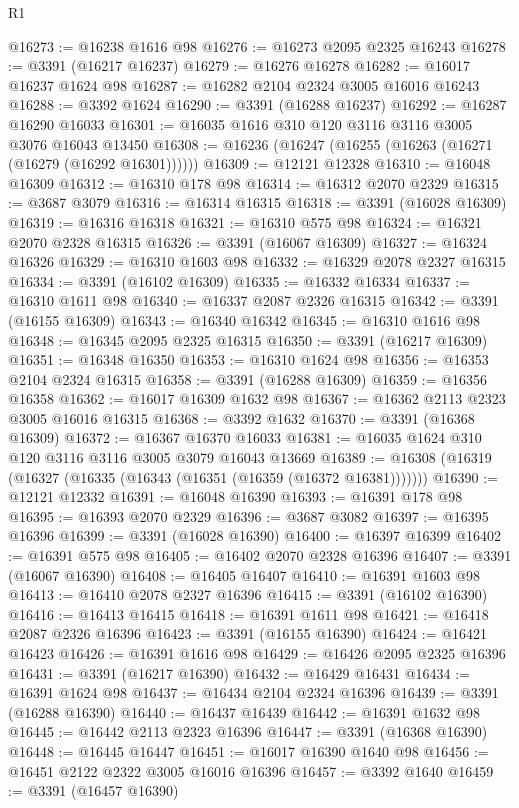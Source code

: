 \begin{lexlean}{R1}
\begin{coremodule}
@16273 := @16238 @1616 @98
@16276 := @16273 @2095 @2325 @16243
@16278 := @3391 (@16217 @16237)
@16279 := @16276 @16278
@16282 := @16017 @16237 @1624 @98
@16287 := @16282 @2104 @2324 @3005 @16016 @16243
@16288 := @3392 @1624
@16290 := @3391 (@16288 @16237)
@16292 := @16287 @16290 @16033
@16301 := @16035 @1616 @310 @120 @3116 @3116 @3005 @3076 @16043 @13450
@16308 := @16236 (@16247 (@16255 (@16263 (@16271 (@16279 (@16292 @16301))))))
@16309 := @12121 @12328
@16310 := @16048 @16309
@16312 := @16310 @178 @98
@16314 := @16312 @2070 @2329
@16315 := @3687 @3079
@16316 := @16314 @16315
@16318 := @3391 (@16028 @16309)
@16319 := @16316 @16318
@16321 := @16310 @575 @98
@16324 := @16321 @2070 @2328 @16315
@16326 := @3391 (@16067 @16309)
@16327 := @16324 @16326
@16329 := @16310 @1603 @98
@16332 := @16329 @2078 @2327 @16315
@16334 := @3391 (@16102 @16309)
@16335 := @16332 @16334
@16337 := @16310 @1611 @98
@16340 := @16337 @2087 @2326 @16315
@16342 := @3391 (@16155 @16309)
@16343 := @16340 @16342
@16345 := @16310 @1616 @98
@16348 := @16345 @2095 @2325 @16315
@16350 := @3391 (@16217 @16309)
@16351 := @16348 @16350
@16353 := @16310 @1624 @98
@16356 := @16353 @2104 @2324 @16315
@16358 := @3391 (@16288 @16309)
@16359 := @16356 @16358
@16362 := @16017 @16309 @1632 @98
@16367 := @16362 @2113 @2323 @3005 @16016 @16315
@16368 := @3392 @1632
@16370 := @3391 (@16368 @16309)
@16372 := @16367 @16370 @16033
@16381 := @16035 @1624 @310 @120 @3116 @3116 @3005 @3079 @16043 @13669
@16389 := @16308 (@16319 (@16327 (@16335 (@16343 (@16351 (@16359 (@16372 @16381)))))))
@16390 := @12121 @12332
@16391 := @16048 @16390
@16393 := @16391 @178 @98
@16395 := @16393 @2070 @2329
@16396 := @3687 @3082
@16397 := @16395 @16396
@16399 := @3391 (@16028 @16390)
@16400 := @16397 @16399
@16402 := @16391 @575 @98
@16405 := @16402 @2070 @2328 @16396
@16407 := @3391 (@16067 @16390)
@16408 := @16405 @16407
@16410 := @16391 @1603 @98
@16413 := @16410 @2078 @2327 @16396
@16415 := @3391 (@16102 @16390)
@16416 := @16413 @16415
@16418 := @16391 @1611 @98
@16421 := @16418 @2087 @2326 @16396
@16423 := @3391 (@16155 @16390)
@16424 := @16421 @16423
@16426 := @16391 @1616 @98
@16429 := @16426 @2095 @2325 @16396
@16431 := @3391 (@16217 @16390)
@16432 := @16429 @16431
@16434 := @16391 @1624 @98
@16437 := @16434 @2104 @2324 @16396
@16439 := @3391 (@16288 @16390)
@16440 := @16437 @16439
@16442 := @16391 @1632 @98
@16445 := @16442 @2113 @2323 @16396
@16447 := @3391 (@16368 @16390)
@16448 := @16445 @16447
@16451 := @16017 @16390 @1640 @98
@16456 := @16451 @2122 @2322 @3005 @16016 @16396
@16457 := @3392 @1640
@16459 := @3391 (@16457 @16390)

\end{coremodule}
\end{lexlean}
